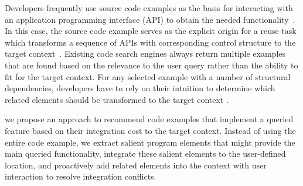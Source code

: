 Developers frequently use source code examples as the basis for interacting with an  application programming interface (API) to obtain the needed functionality~\cite{CodeSearch:FSE15}.  In this case, the source code example serves as the explicit origin for a reuse task which transforms a sequence of APIs with corresponding control structure to the target context~\cite{Frakes:reuseStatus05}.  Existing code search engines always return multiple examples that are found based on the relevance to the user query rather than the ability to fit for the target context. For any selected example  with a number of structural dependencies, developers have to rely on their intuition to determine which related elements should be transformed to the target context .

we propose an approach to  recommend  code examples that implement a queried feature based on their integration cost to the target context. Instead of using the entire code example, we extract salient program elements that might provide the main queried functionality, integrate these salient elements to the user-defined location, and proactively add related elements into the context with user interaction to resolve integration conflicts.





